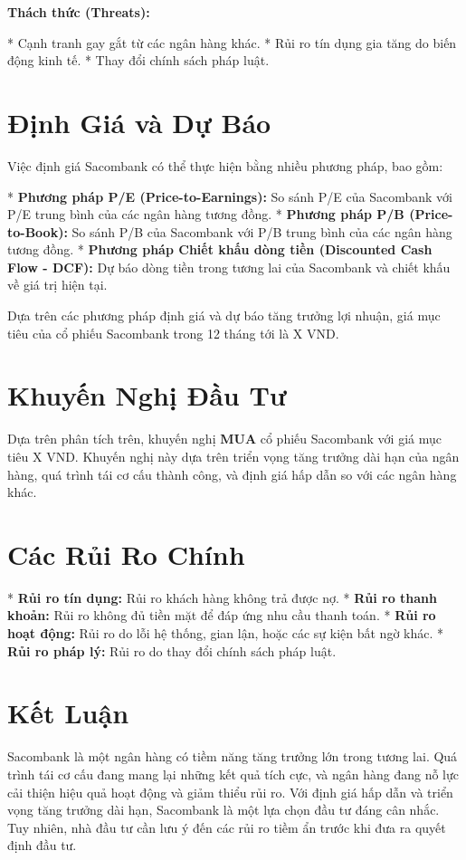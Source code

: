 \documentclass[12pt]{article}
\begin{document}
\textbf{Thách thức (Threats):}

*   Cạnh tranh gay gắt từ các ngân hàng khác.
*   Rủi ro tín dụng gia tăng do biến động kinh tế.
*   Thay đổi chính sách pháp luật.

\section{Định Giá và Dự Báo}

Việc định giá Sacombank có thể thực hiện bằng nhiều phương pháp, bao gồm:

*   \textbf{Phương pháp P/E (Price-to-Earnings):} So sánh P/E của Sacombank với P/E trung bình của các ngân hàng tương đồng.
*   \textbf{Phương pháp P/B (Price-to-Book):} So sánh P/B của Sacombank với P/B trung bình của các ngân hàng tương đồng.
*   \textbf{Phương pháp Chiết khấu dòng tiền (Discounted Cash Flow - DCF):} Dự báo dòng tiền trong tương lai của Sacombank và chiết khấu về giá trị hiện tại.

Dựa trên các phương pháp định giá và dự báo tăng trưởng lợi nhuận, giá mục tiêu của cổ phiếu Sacombank trong 12 tháng tới là X VND.

\section{Khuyến Nghị Đầu Tư}

Dựa trên phân tích trên, khuyến nghị \textbf{MUA} cổ phiếu Sacombank với giá mục tiêu X VND.  Khuyến nghị này dựa trên triển vọng tăng trưởng dài hạn của ngân hàng, quá trình tái cơ cấu thành công, và định giá hấp dẫn so với các ngân hàng khác.

\section{Các Rủi Ro Chính}

*   \textbf{Rủi ro tín dụng:} Rủi ro khách hàng không trả được nợ.
*   \textbf{Rủi ro thanh khoản:} Rủi ro không đủ tiền mặt để đáp ứng nhu cầu thanh toán.
*   \textbf{Rủi ro hoạt động:} Rủi ro do lỗi hệ thống, gian lận, hoặc các sự kiện bất ngờ khác.
*   \textbf{Rủi ro pháp lý:} Rủi ro do thay đổi chính sách pháp luật.

\section{Kết Luận}

Sacombank là một ngân hàng có tiềm năng tăng trưởng lớn trong tương lai. Quá trình tái cơ cấu đang mang lại những kết quả tích cực, và ngân hàng đang nỗ lực cải thiện hiệu quả hoạt động và giảm thiểu rủi ro. Với định giá hấp dẫn và triển vọng tăng trưởng dài hạn, Sacombank là một lựa chọn đầu tư đáng cân nhắc. Tuy nhiên, nhà đầu tư cần lưu ý đến các rủi ro tiềm ẩn trước khi đưa ra quyết định đầu tư.
\end{document}
